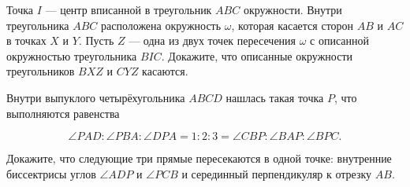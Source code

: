 Точка $I$ --- центр вписанной в треугольник $ABC$ окружности. Внутри треугольника $ABC$ расположена окружность $\omega$, которая касается сторон $AB$ и $AC$ в точках $X$ и $Y$. Пусть $Z$ --- одна из двух точек пересечения $\omega$ с описанной окружностью треугольника $BIC$. Докажите, что описанные окружности треугольников $BXZ$ и $CYZ$ касаются.

Внутри выпуклого четырёхугольника $ABCD$ нашлась такая точка $P$, что выполняются равенства

$$\angle PAD: \angle PBA:\angle DPA=1:2:3=\angle CBP:\angle BAP:\angle BPC.$$

Докажите, что следующие три прямые пересекаются в одной точке: внутренние биссектрисы углов $\angle ADP$ и $\angle PCB$ и серединный перпендикуляр к отрезку $AB$.